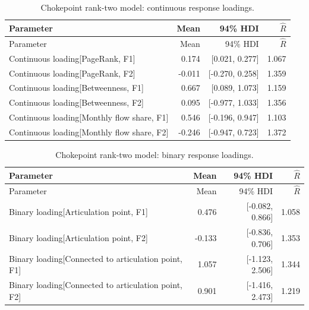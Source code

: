 \documentclass[pdftex,12pt,openright,a4paper,oneside]{book}
\begin{document}
\begin{longtable}{@{}p{}rrr@{}}

\caption{Chokepoint rank-two model: continuous response loadings.}\label{tab:chokepoint_rank2_391}\\

\toprule

Parameter & Mean & 94\% HDI & $\widehat R$ \\

\midrule\endfirsthead

\toprule

Parameter & Mean & 94\% HDI & $\widehat R$ \\

\midrule\endhead

Continuous loading[PageRank, F1] & 0.174 & [0.021, 0.277] & 1.067 \\

Continuous loading[PageRank, F2] & -0.011 & [-0.270, 0.258] & 1.359 \\

Continuous loading[Betweenness, F1] & 0.667 & [0.089, 1.073] & 1.159 \\

Continuous loading[Betweenness, F2] & 0.095 & [-0.977, 1.033] & 1.356 \\

Continuous loading[Monthly flow share, F1] & 0.546 & [-0.196, 0.947] & 1.103 \\

Continuous loading[Monthly flow share, F2] & -0.246 & [-0.947, 0.723] & 1.372 \\

\bottomrule\end{longtable}


\begin{longtable}{@{}p{}rrr@{}}

\caption{Chokepoint rank-two model: binary response loadings.}\label{tab:chokepoint_rank2_406}\\

\toprule

Parameter & Mean & 94\% HDI & $\widehat R$ \\

\midrule\endfirsthead

\toprule

Parameter & Mean & 94\% HDI & $\widehat R$ \\

\midrule\endhead

Binary loading[Articulation point, F1] & 0.476 & [-0.082, 0.866] & 1.058 \\

Binary loading[Articulation point, F2] & -0.133 & [-0.836, 0.706] & 1.353 \\

Binary loading[Connected to articulation point, F1] & 1.057 & [-1.123, 2.506] & 1.344 \\

Binary loading[Connected to articulation point, F2] & 0.901 & [-1.416, 2.473] & 1.219 \\

\bottomrule\end{longtable}
\end{document}
